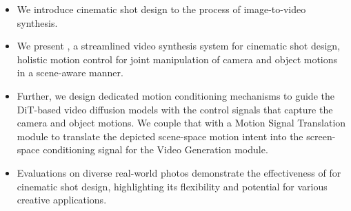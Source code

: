 \begin{itemize} 
%
\item We introduce cinematic shot design to the process of image-to-video synthesis. 
%
\item We present \MOCA, a streamlined video synthesis system for cinematic shot design, 
 holistic motion control 
for joint manipulation of camera and object motions in a scene-aware manner. 
%
\item 
Further, we design dedicated motion conditioning mechanisms to guide the DiT-based video diffusion models with 
the control signals that capture the camera and object motions. We couple that with a Motion Signal Translation module to translate the depicted scene-space motion intent into the screen-space conditioning signal for the Video Generation module. 
%
\item Evaluations on diverse 
real-world photos 
demonstrate the effectiveness of \MOCA for cinematic shot design, highlighting its flexibility and potential for various creative applications. 
%
\end{itemize}
